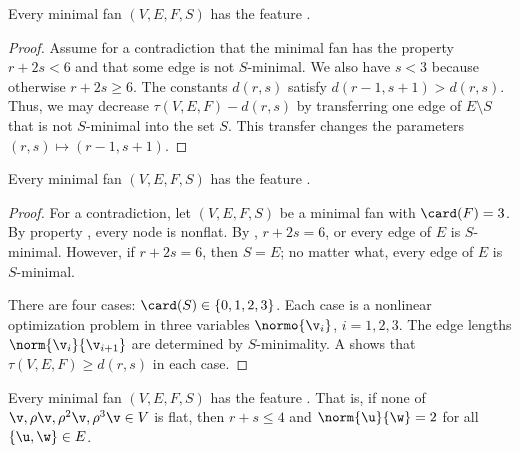 

\begin{lemma}[s~minimal] \label{l:sm}
Every minimal fan $(V,E,F,S)$ has the feature .
\end{lemma}

\begin{proof} Assume for a contradiction that the minimal fan has the
  property $r+2s < 6$ and that some edge is not $S$-minimal.  We also
  have $s<3$ because otherwise $r+2s\ge 6$.  The constants $d(r,s)$
  satisfy $d(r-1,s+1) > d(r,s)$.  Thus, we may decrease
  $\tau(V,E,F)-d(r,s)$ by transferring one edge of $E\setminus S$ that
  is not $S$-minimal into the set $S$.  This transfer changes the parameters
  $(r,s)\mapsto (r-1,s+1)$.
\end{proof}

\begin{lemma}\label{lemma:triangle-free}\label{l:tf}
Every minimal fan $(V,E,F,S)$ has the feature .
\end{lemma}

\begin{proof}
  For a contradiction, let $(V,E,F,S)$ be a minimal fan with
  $\card(F)=3$.  By property , every node is nonflat.
  By , $r+2s=6$, or every edge of $E$ is $S$-minimal.
  However, if $r+2s=6$, then $S=E$;  no matter what, every edge
  of $E$ is $S$-minimal.

There are four cases: $\card(S)\in\{0,1,2,3\}$.  Each case is a
nonlinear optimization problem in three variables $\normo{\v_i}$,
$i=1,2,3$.  The edge lengths $\norm{\v_i}{\v_{i+1}}$ are determined by
$S$-minimality.  A  shows that
$\tau(V,E,F)\ge d(r,s)$ in each case.
\end{proof}





\begin{lemma}\label{lemma:flat-exists}\label{l:fe}
Every minimal fan $(V,E,F,S)$ has the feature .
  That is, if none of $\v,\rho
\v,\rho^2 \v,\rho^3 \v\in V$ is flat, then $r+s\le 4$ and
$\norm{\u}{\w}=2$ for all $\{\u,\w\}\in E$.
\end{lemma}

